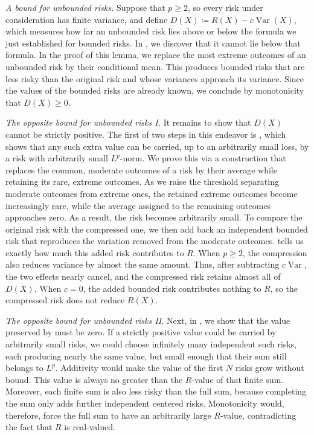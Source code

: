 \documentclass[11pt]{amsart}
\theoremstyle{plain}
\theoremstyle{definition}
\theoremstyle{remark}
\numberwithin{equation}{section}
\newcommand{\1}{\mathbf 1}
\begin{document}
\emph{A bound for unbounded risks.} Suppose that \(p\geq2\), so every risk under consideration has finite variance, and define \(D(X)\coloneqq R(X)-c\operatorname{Var}(X)\), which measures how far an unbounded risk lies above or below the formula we just established for bounded risks. In , we discover that it cannot lie below that formula. In the proof of this lemma, we replace the most extreme outcomes of an unbounded risk by their conditional mean. This produces bounded risks that are less risky than the original risk and whose variances approach its variance. Since the values of the bounded risks are already known, we conclude by monotonicity that \(D(X)\geq0\).

\emph{The opposite bound for unbounded risks I.}
It remains to show that \(D(X)\) cannot be strictly positive. The first of two steps in this endeavor is , which shows that any such extra value can be carried, up to an arbitrarily small loss, by a risk with arbitrarily small \(L^p\)-norm. We prove this via a construction that replaces the common, moderate outcomes of a risk by their average while retaining its rare, extreme outcomes. As we raise the threshold separating moderate outcomes from extreme ones, the retained extreme outcomes become increasingly rare, while the average assigned to the remaining outcomes approaches zero. As a result, the risk becomes arbitrarily small. To compare the original risk with the compressed one, we then add back an independent bounded risk that reproduces the variation removed from the moderate outcomes.  tells us exactly how much this added risk contributes to \(R\). When \(p\geq2\), the compression also reduces variance by almost the same amount. Thus, after subtracting \(c\operatorname{Var}\), the two effects nearly cancel, and the compressed risk retains almost all of \(D(X)\). When \(c=0\), the added bounded risk contributes nothing to \(R\), so the compressed risk does not reduce \(R(X)\).

\emph{The opposite bound for unbounded risks II.}
Next, in , we show that the value preserved by  must be zero. If a strictly positive value could be carried by arbitrarily small risks, we could choose infinitely many independent such risks, each producing nearly the same value, but small enough that their sum still belongs to \(L^p\). Additivity would make the value of the first \(N\) risks grow without bound. This value is always no greater than the \(R\)-value of that finite sum. Moreover, each finite sum is also less risky than the full sum, because completing the sum only adds further independent centered risks. Monotonicity would, therefore, force the full sum to have an arbitrarily large \(R\)-value, contradicting the fact that \(R\) is real-valued.
\end{document}
